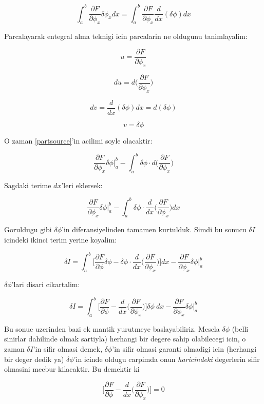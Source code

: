 \documentclass[12pt,fleqn]{article}
\begin{document}
\begin{equation} 
\int_{a}^{b} \frac{\partial F}{\partial \phi_x}\delta\phi_x dx =
\int_{a}^{b} \frac{\partial F}{\partial \phi_x} \frac{d}{dx}(\delta \phi) dx \label{partsource}
\end{equation} 

Parcalayarak entegral alma teknigi icin parcalarin ne oldugunu tanimlayalim:

\[ u = \frac{\partial F}{\partial \phi_x}  \]

\[ du  = d \bigg( \frac{\partial F}{\partial \phi_x} \bigg) \]

\[ dv  = \frac{d}{dx}(\delta \phi)dx = d(\delta \phi) \]

\[ v  = \delta \phi \]

O zaman \ref{partsource}'in acilimi soyle olacaktir:

\[ 
\frac{\partial F}{\partial \phi_x} \delta \phi \bigg|_a^b - 
\int_a^b \delta \phi \cdot d \bigg( \frac{\partial F}{\partial \phi_x} \bigg)
 \]

Sagdaki terime $dx$'leri eklersek:

\[ 
\frac{\partial F}{\partial \phi_x} \delta \phi \bigg|_a^b - 
\int_a^b \delta \phi \cdot \frac{d}{dx} \bigg( \frac{\partial F}{\partial \phi_x} \bigg) dx
 \]

Goruldugu gibi $\delta \phi$'in diferansiyelinden tamamen kurtulduk. Simdi bu
sonucu $\delta I$ icindeki ikinci terim yerine koyalim:

\[ 
\delta I  = \int_{a}^{b} 
\bigg[ \frac{\partial F}{\partial \phi}\delta\phi -
\delta \phi \cdot \frac{d}{dx} \bigg( \frac{\partial F}{\partial \phi_x} \bigg)
\bigg] dx - \frac{\partial F}{\partial \phi_x} \delta \phi \bigg|_a^b 
 \]

$\delta \phi$'lari disari cikartalim:

\[ 
\delta I  = \int_{a}^{b} \bigg[
\frac{\partial F}{\partial \phi} -
\frac{d}{dx} \bigg( \frac{\partial F}{\partial \phi_x} \bigg)
\bigg] \delta\phi \ dx
- \frac{\partial F}{\partial \phi_x} \delta \phi \bigg|_a^b 
 \]

Bu sonuc uzerinden bazi ek mantik yurutmeye baslayabiliriz. Mesela $\delta \phi$
(belli sinirlar dahilinde olmak sartiyla) herhangi bir degere sahip olabilecegi
icin, o zaman $\delta I$'in sifir olmasi demek, $\delta \phi$'in sifir olmasi
garanti olmadigi icin (herhangi bir deger dedik ya) $\delta \phi$'in icinde
oldugu carpimda onun {\em haricindeki} degerlerin sifir olmasini mecbur
kilacaktir. Bu demektir ki

\[ 
\bigg[
\frac{\partial F}{\partial \phi} -
\frac{d}{dx} \bigg( \frac{\partial F}{\partial \phi_x} \bigg)
\bigg] = 0
 \]
\end{document}
